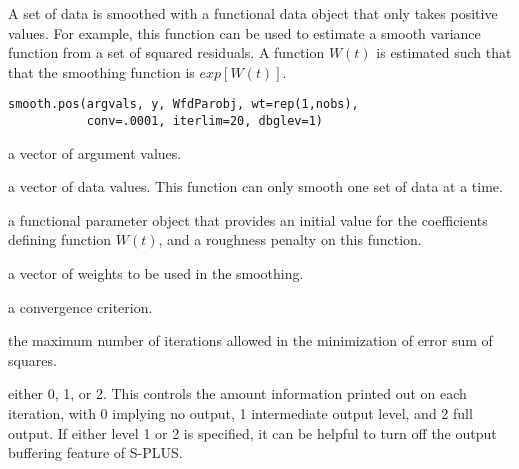\documentclass{article}
\begin{document}
\begin{Description}\relax
A set of data is smoothed with a functional data object that only
takes positive values.  For example, this function can be used
to estimate a smooth variance function from a set of squared residuals.
A function $W(t)$ is estimated such that that the smoothing
function is $exp[W(t)]$.
\end{Description}
\begin{Usage}
\begin{verbatim}
smooth.pos(argvals, y, WfdParobj, wt=rep(1,nobs),
           conv=.0001, iterlim=20, dbglev=1)
\end{verbatim}
\end{Usage}
\begin{Arguments}
\begin{ldescription}
\item[\code{argvals}] a vector of argument values.

\item[\code{y}] a vector of data values.  This function can only smooth
one set of data at a time.

\item[\code{WfdParobj}] a functional parameter object that provides an initial
value for the coefficients defining function $W(t)$,
and a roughness penalty on this function.

\item[\code{wt}] a vector of weights to be used in the smoothing.

\item[\code{conv}] a convergence criterion.

\item[\code{iterlim}] the maximum number of iterations allowed in the minimization
of error sum of squares.

\item[\code{dbglev}] either 0, 1, or 2.  This controls the amount information printed out on
each iteration, with 0 implying no output, 1 intermediate output level,
and 2 full output.  If either level 1 or 2 is specified, it can be
helpful to turn off the output buffering feature of S-PLUS.

\end{ldescription}
\end{Arguments}
\end{document}
